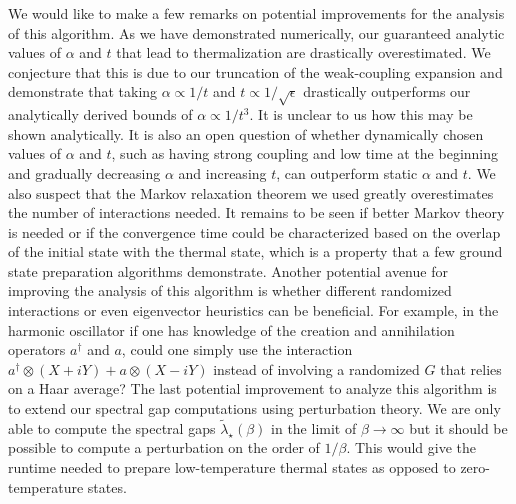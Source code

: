 \documentclass{article}
\begin{document}
We would like to make a few remarks on potential improvements for the analysis of this algorithm. As we have demonstrated numerically, our guaranteed analytic values of $\alpha$ and $t$ that lead to thermalization are drastically overestimated. We conjecture that this is due to our truncation of the weak-coupling expansion and demonstrate that taking $\alpha \propto 1/t$ and $t \propto 1/ \sqrt{\epsilon}$ drastically outperforms our analytically derived bounds of $\alpha \propto 1/t^3$. It is unclear to us how this may be shown analytically. It is also an open question of whether dynamically chosen values of $\alpha$ and $t$, such as having strong coupling and low time at the beginning and gradually decreasing $\alpha$ and increasing $t$, can outperform static $\alpha$ and $t$. We also suspect that the Markov relaxation theorem we used greatly overestimates the number of interactions needed. It remains to be seen if better Markov theory is needed or if the convergence time could be characterized based on the overlap of the initial state with the thermal state, which is a property that a few ground state preparation algorithms demonstrate. Another potential avenue for improving the analysis of this algorithm is whether different randomized interactions or even eigenvector heuristics can be beneficial. For example, in the harmonic oscillator if one has knowledge of the creation and annihilation operators $a^\dagger$ and $a$, could one simply use the interaction $a^\dagger \otimes (X + i Y) + a \otimes (X - i Y)$ instead of involving a randomized $G$ that relies on a Haar average? The last potential improvement to analyze this algorithm is to extend our spectral gap computations using perturbation theory. We are only able to compute the spectral gaps $\widetilde{\lambda}_\star(\beta)$ in the limit of $\beta \to \infty$ but it should be possible to compute a perturbation on the order of $1/\beta$. This would give the runtime needed to prepare low-temperature thermal states as opposed to zero-temperature states.
\end{document}
